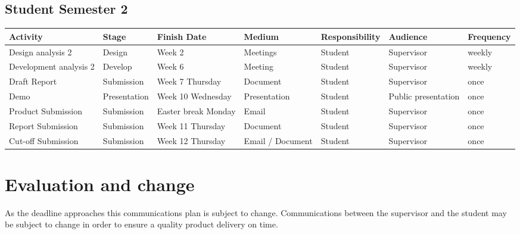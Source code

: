 	\vspace{6mm}
		
	\subsection{Student Semester 2}
	
	\begin{center}

		\begin{tabular}{ | >{\scriptsize}p{35mm} | >{\scriptsize}p{15mm} | >{\scriptsize}p{25mm} | >{\scriptsize}p{15mm} | >{\scriptsize}p{25mm} | >{\scriptsize}p{15mm} | >{\scriptsize}p{15mm} |}
			\hline

			\textbf{Activity} 		& \textbf{Stage} 	& \textbf{Finish Date} 	& \textbf{Medium} 	& \textbf{Responsibility} 	& \textbf{Audience} 		& \textbf{Frequency} 	\\ \hline
			Design analysis 2 		& Design 			& Week 2 				& Meetings 			& Student 					& Supervisor 				& weekly 				\\ \hline
			\rowcolor[gray]{.98}
			Development analysis 2 	& Develop 			& Week 6 				& Meeting 			& Student 					& Supervisor 				& weekly 				\\ \hline
			Draft Report 			& Submission 		& Week 7 Thursday 		& Document 			& Student 					& Supervisor 				& once 					\\ \hline
			\rowcolor[gray]{.98}
			Demo 					& Presentation 		& Week 10 Wednesday 	& Presentation 		& Student 					& Public presentation		& once 					\\ \hline
			Product Submission 		& Submission 		& Easter break Monday 	& Email 			& Student 					& Supervisor				& once 					\\ \hline
			\rowcolor[gray]{.98}
			Report Submission 		& Submission 		& Week 11 Thursday 		& Document 			& Student 					& Supervisor				& once 					\\ \hline
			Cut-off Submission 		& Submission 		& Week 12 Thursday 		& Email / Document	& Student 					& Supervisor				& once 					\\ \hline

		\end{tabular}
			
	\end{center}
	
	\vspace{6mm}
		
	\section{Evaluation and change}
		
		As the deadline approaches this communications plan is subject to change.   
		Communications between the supervisor and the student may be subject to change in order to ensure a quality product delivery on time.

	
